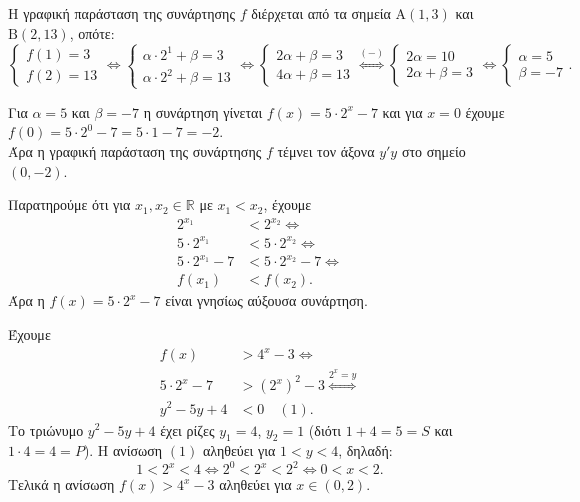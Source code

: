 \begin{alist}
\item Η γραφική παράσταση της συνάρτησης $f$ διέρχεται από τα σημεία $\text{A}(1,3)$ και $\text{B}(2,13)$, οπότε:
\[\begin{cases} f(1) = 3 \\ f(2) = 13 \end{cases} \Leftrightarrow \begin{cases} \alpha\cdot 2^1 + \beta = 3 \\ \alpha\cdot 2^2 + \beta = 13 \end{cases} \Leftrightarrow \begin{cases} 2\alpha + \beta = 3 \\ 4\alpha + \beta = 13 \end{cases} \overset{(-)}{\iff} \begin{cases} 2\alpha = 10 \\ 2\alpha + \beta = 3 \end{cases} \Leftrightarrow \begin{cases} \alpha = 5 \\ \beta = -7 \end{cases}.\]
\item Για $\alpha = 5$ και $\beta = -7$ η συνάρτηση γίνεται $f(x) = 5\cdot 2^x - 7$ και για $x = 0$ έχουμε $f(0) = 5\cdot 2^0 - 7 = 5\cdot 1 - 7 = -2$. \\
Άρα η γραφική παράσταση της συνάρτησης $f$ τέμνει τον άξονα $y'y$ στο σημείο $(0,-2)$.
\item Παρατηρούμε ότι για $x_1, x_2 \in \mathbb{R}$ με $x_1 < x_2$, έχουμε
\begin{align*}
2^{x_1} &< 2^{x_2} \Leftrightarrow \\
5\cdot 2^{x_1} &< 5\cdot 2^{x_2} \Leftrightarrow \\
5\cdot 2^{x_1} - 7 &< 5\cdot 2^{x_2} - 7 \Leftrightarrow \\
f(x_1) &< f(x_2).
\end{align*}
Άρα η $f(x) = 5\cdot 2^x - 7$ είναι γνησίως αύξουσα συνάρτηση.
\item Έχουμε
\begin{align*}
f(x) &> 4^x - 3 \Leftrightarrow \\
5\cdot 2^x - 7 &> (2^x)^2 - 3 \overset{2^x=y}{\iff} \\
y^2 - 5y + 4 &< 0 \quad (1).
\end{align*}
Το τριώνυμο $y^2 - 5y + 4$ έχει ρίζες $y_1 = 4$, $y_2 = 1$ (διότι $1+4=5=S$ και $1\cdot 4=4=P$). Η ανίσωση $(1)$ αληθεύει για $1 < y < 4$, δηλαδή:
\[1 < 2^x < 4 \Leftrightarrow 2^0 < 2^x < 2^2 \Leftrightarrow 0 < x < 2.\]
Τελικά η ανίσωση $f(x) > 4^x - 3$ αληθεύει για $x \in (0,2)$.
\end{alist}

